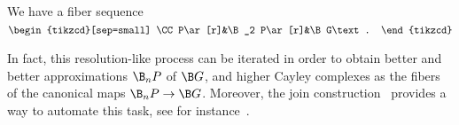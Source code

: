 \begin{theorem}
  We have a fiber sequence $
  \begin{tikzcd}[sep=small]
    \CC P\ar[r]&\B_2 P\ar[r]&\B G\text.
  \end{tikzcd}
  $
\end{theorem}

\noindent
In fact, this resolution-like process can be iterated in order to obtain better
and better approximations $\B_nP$ of $\B G$, and higher Cayley complexes as the fibers of the canonical
maps $\B_nP\to\B G$. Moreover, the join
construction~\cite{rijke2017join,rijke2018classifying} provides a way to
automate this task, see for instance~\cite{buchholtz2017real,lens}.

